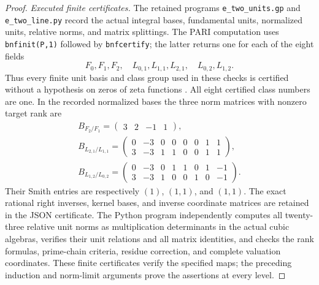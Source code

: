 \begin{proof}
\emph{Executed finite certificates.}
The retained programs
\texttt{e\_two\_units.gp} and
\texttt{e\_two\_line.py}
record the actual integral bases,
fundamental units, normalized units,
relative norms, and matrix splittings.
The PARI computation uses
\texttt{bnfinit(P,1)} followed by
\texttt{bnfcertify}; the latter
returns one for each of the eight
fields
\[
 F_0,F_1,F_2,\quad
 L_{0,1},L_{1,1},L_{2,1},\quad
 L_{0,2},L_{1,2}.
 \tag{E52.26}
\]
Thus every finite unit basis and
class group used in these checks
is certified without a hypothesis
on zeros of zeta functions
\cite{E_PARICertifiedUnits}.
All eight certified class numbers
are one. In the recorded normalized
bases the three norm matrices
with nonzero target rank are
\[
 \begin{gathered}
 B_{F_2/F_1}=\begin{pmatrix}3&2&-1&1\end{pmatrix},\\
 B_{L_{2,1}/L_{1,1}}=
 \begin{pmatrix}
 0&-3&0&0&0&0&1&1\\
 3&-3&1&1&0&0&1&1
 \end{pmatrix},\\
 B_{L_{1,2}/L_{0,2}}=
 \begin{pmatrix}
 0&-3&0&1&1&0&1&-1\\
 3&-3&1&0&0&1&0&-1
 \end{pmatrix}.
 \end{gathered}
 \tag{E52.27}
\]
Their Smith entries are respectively
$(1)$, $(1,1)$, and $(1,1)$.
The exact rational right inverses,
kernel bases, and inverse coordinate
matrices are retained in the JSON
certificate. The Python program
independently computes all twenty-three
relative unit norms as multiplication
determinants in the actual cubic
algebras, verifies their unit
relations and all matrix identities,
and checks the rank formulas,
prime-chain criteria, residue correction,
and complete valuation coordinates.
These finite certificates verify the
specified maps; the preceding
induction and norm-limit arguments
prove the assertions at every level.
\end{proof}
